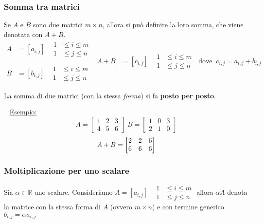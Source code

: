 \documentclass[12pt,oneside]{book}
\begin{document}
\subsubsection{Somma tra matrici}
Se $A$ e $B$ sono due matrici $m \times n$, allora si può definire la loro somma, che viene
denotata con $A+B$.
\begin{equation*}
    \begin{split}
        A & = [a_{i,j}] \;\;\; \begin{aligned} 1&\le i\le m\\ 1&\le j\le n \end{aligned} \\
        \\
        B & = [b_{i,j}] \;\;\; \begin{aligned} 1&\le i\le m\\ 1&\le j\le n \end{aligned}
    \end{split}
    \begin{split}
        A+B & = [c_{i,j}] \;\;\; \begin{aligned} 1&\le i\le m\\ 1&\le j\le n \end{aligned} \;\; \text{dove} \;\;
        c_{i,j} = a_{i,j} + b_{i,j}
    \end{split}
\end{equation*}

La somma di due matrici (con la stessa \emph{forma}) si fa \textbf{posto per posto}.

~\newline
\underline{Esempio:}
\begin{equation*}
    A=
    \begin{bmatrix}
        1 & 2 & 3 \\
        4 & 5 & 6
    \end{bmatrix} \;
    B=
    \begin{bmatrix}
        1 & 0 & 3 \\
        2 & 1 & 0
    \end{bmatrix}
\end{equation*}
\begin{equation*}
    \\ A+B=
    \begin{bmatrix}
        2 & 2 & 6 \\
        6 & 6 & 6
    \end{bmatrix}
\end{equation*}

\subsubsection{Moltiplicazione per uno scalare}
Sia $\alpha \in \mathbb{R}$ uno scalare.
Consideriamo $A=[a_{i,j}]\;\;\; \begin{aligned} 1&\le i\le m\\ 1&\le j\le n \end{aligned}$
allora $\alpha A$ denota la matrice con la stessa forma di $A$ (ovvero $m \times n$) e con
termine generico $b_{i,j} = \alpha a_{i,j}$
\end{document}
